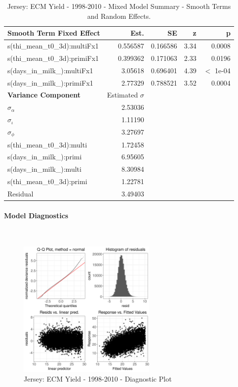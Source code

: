 \newpage
\begin{table}[H]
\centering
\begin{tabular}
{l | r | r | r | r}
\textbf{Smooth Term Fixed Effect} & Est. & SE & z & p\\
\hline
\hline
s(thi\_mean\_t0\_3d):multiFx1 & 0.556587 & 0.166586 & 3.34 & 0.0008\\
s(thi\_mean\_t0\_3d):primiFx1 & 0.399362 & 0.171063 & 2.33 & 0.0196\\
s(days\_in\_milk\_):multiFx1 & 3.05618 & 0.696401 & 4.39 & $<$ 1e-04\\
s(days\_in\_milk\_):primiFx1 & 2.77329 & 0.788521 & 3.52 & 0.0004\\
\hline
\textbf{Variance Component} & Estimated $\sigma$ & & & \\
\hline
\hline
$\sigma_\alpha$ & 2.53036 & &  & \\
$\sigma_\iota$ & 1.11190 & & & \\
$\sigma_\phi$ & 3.27697 & & & \\
s(thi\_mean\_t0\_3d):multi & 1.72458 & & & \\
s(days\_in\_milk\_):primi & 6.95605 & & & \\
s(days\_in\_milk\_):multi & 8.30984 & & & \\
s(thi\_mean\_t0\_3d):primi & 1.22781 & & & \\
Residual & 3.49403 & & & \\
\end{tabular}
\caption[]{Jersey: ECM Yield - 1998-2010 - Mixed Model Summary - Smooth Terms and Random Effects.}
\end{table}


\paragraph{Model Diagnostics} \quad \\
\begin{figure}[H]
    \centering
    \includegraphics[width=0.6\textwidth]{thesis/figures/models/ecm/before2010/je_ecm_before2010/je_ecm_before2010_diagnostics.png}
    \caption[]{Jersey: ECM Yield - 1998-2010 - Diagnostic Plot}
\end{figure}

